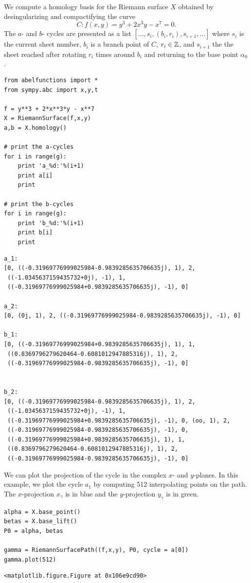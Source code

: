 We compute a homology basis for the Riemann surface $X$ obtained by
desingularizing and compactifying the curve
\[
  C : f(x,y) = y^3 + 2x^3y - x^7 = 0.
\]
The $a$- and $b$- cycles are presented as a list $[\ldots, s_i,(b_i,r_i),
s_{i+1}, \ldots]$ where $s_i$ is the current sheet number, $b_i$ is a branch
point of $C$, $r_i \in \operatorname{\mathbb{Z}}$, and $s_{i+1}$ the the sheet reached after rotating
$r_i$ times around $b_i$ and returning to the base point $\alpha_0$.
\begin{lstlisting}
from abelfunctions import *
from sympy.abc import x,y,t

f = y**3 + 2*x**3*y - x**7
X = RiemannSurface(f,x,y)
a,b = X.homology()

# print the a-cycles
for i in range(g):
    print 'a_%d:'%(i+1)
    print a[i]
    print

# print the b-cycles
for i in range(g):
    print 'b_%d:'%(i+1)
    print b[i]
    print
\end{lstlisting}
\begin{lstlisting}
a_1:
[0, ((-0.31969776999025984-0.9839285635706635j), 1), 2,
 ((-1.0345637159435732+0j), -1), 1,
 ((-0.31969776999025984+0.9839285635706635j), -1), 0]

a_2:
[0, (0j, 1), 2, ((-0.31969776999025984-0.9839285635706635j), -1), 0]

b_1:
[0, ((-0.31969776999025984+0.9839285635706635j), 1), 1,
 ((0.8369796279620464-0.6081012947885316j), 1), 2,
 ((-0.31969776999025984-0.9839285635706635j), -1), 0]


b_2:
[0, ((-0.31969776999025984-0.9839285635706635j), 1), 2,
 ((-1.0345637159435732+0j), -1), 1,
 ((-0.31969776999025984+0.9839285635706635j), -1), 0, (oo, 1), 2,
 ((-0.31969776999025984-0.9839285635706635j), -1), 0,
 ((-0.31969776999025984+0.9839285635706635j), 1), 1,
 ((0.8369796279620464-0.6081012947885316j), 1), 2,
 ((-0.31969776999025984-0.9839285635706635j), -1), 0]
\end{lstlisting}

We can plot the projection of the cycle in the complex $x$- and $y$-planes. In
this example, we plot the cycle $a_1$ by computing 512 interpolating points on
the path. The $x$-projection $x_\gamma$ is in blue and the $y$-projection
$y_\gamma$ is in green.

\begin{lstlisting}
alpha = X.base_point()
betas = X.base_lift()
P0 = alpha, betas

gamma = RiemannSurfacePath((f,x,y), P0, cycle = a[0])
gamma.plot(512)
\end{lstlisting}
\begin{lstlisting}
<matplotlib.figure.Figure at 0x106e9cd90>
\end{lstlisting}
\begin{center}
\end{center}


